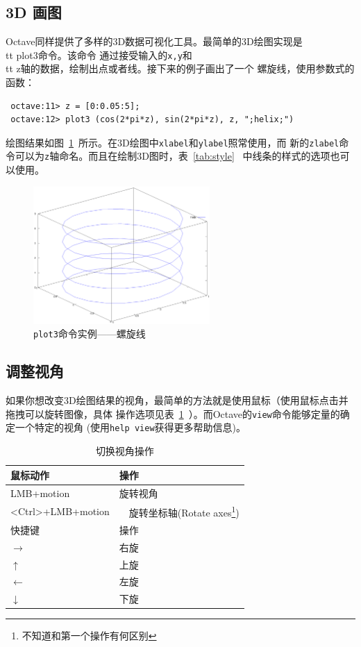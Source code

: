 \documentclass[UTF8,adobefonts]{ctexart}
\begin{document}
\subsection{3D 画图}
Octave同样提供了多样的3D数据可视化工具。最简单的3D绘图实现是{\\tt plot3}命令。该命令
通过接受输入的{\tt x,y}和{\\tt z}轴的数据，绘制出点或者线。接下来的例子画出了一个
螺旋线，使用参数式的函数：
\begin{verbatim}
 octave:11> z = [0:0.05:5];
 octave:12> plot3 (cos(2*pi*z), sin(2*pi*z), z, ";helix;")
\end{verbatim}
绘图结果如图~\ref{plot3}~所示。在3D绘图中{\tt xlabel}和{\tt ylabel}照常使用，而
新的{\tt zlabel}命令可以为{\tt z}轴命名。而且在绘制3D图时，表~\ref{tab:style}~
中线条的样式的选项也可以使用。
\begin{figure}
 \centering
 \includegraphics[width=0.6\textwidth]{plot3.eps}
 \caption{{\tt plot3}命令实例——螺旋线}
 \label{plot3}
\end{figure}
\subsection{调整视角}
如果你想改变3D绘图结果的视角，最简单的方法就是使用鼠标（使用鼠标点击并拖拽可以旋转图像，具体
操作选项见表~\ref{tab:view}~）。而Octave的{\tt view}命令能够定量的确定一个特定的视角
(使用{\tt help view}获得更多帮助信息)。
\begin{table}
 \centering
 \begin{tabular}{|l|l|}
 \hline
 鼠标动作 & 操作 \\
 \hline
 LMB+motion & 旋转视角 \\
 <Ctrl>+LMB+motion &　旋转坐标轴(Rotate axes\footnote{不知道和第一个操作有何区别}) \\
 \hline
 快捷键 & 操作 \\
 \hline
 $\rightarrow$ & 右旋 \\
 $\uparrow$    & 上旋\\
 $\leftarrow$  & 左旋\\
 $\downarrow$  & 下旋\\
 \hline
 \end{tabular}
 \caption{切换视角操作}
 \label{tab:view}
\end{table}
\end{document}
